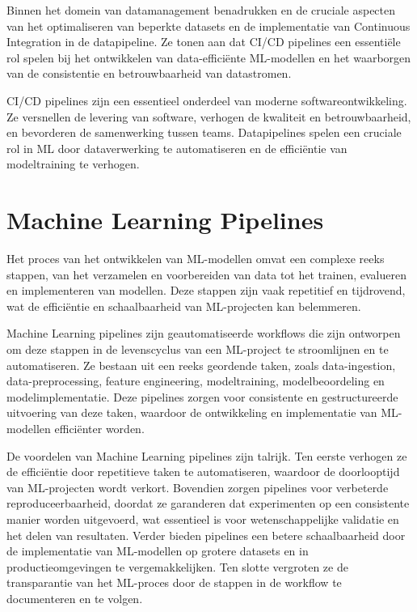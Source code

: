 
Binnen het domein van datamanagement benadrukken \textcite{Samad2018} en \textcite{Vadavalasa2020} de cruciale aspecten van het optimaliseren van beperkte datasets en de implementatie van Continuous Integration in de datapipeline. Ze tonen aan dat CI/CD pipelines een essentiële rol spelen bij het ontwikkelen van data-efficiënte ML-modellen en het waarborgen van de consistentie en betrouwbaarheid van datastromen.

CI/CD pipelines zijn een essentieel onderdeel van moderne softwareontwikkeling. Ze versnellen de levering van software, verhogen de kwaliteit en betrouwbaarheid, en bevorderen de samenwerking tussen teams. Datapipelines spelen een cruciale rol in ML door dataverwerking te automatiseren en de efficiëntie van modeltraining te verhogen.
\section{Machine Learning Pipelines}

Het proces van het ontwikkelen van ML-modellen omvat een complexe reeks stappen, van het verzamelen en voorbereiden van data tot het trainen, evalueren en implementeren van modellen. Deze stappen zijn vaak repetitief en tijdrovend, wat de efficiëntie en schaalbaarheid van ML-projecten kan belemmeren.

Machine Learning pipelines zijn geautomatiseerde workflows die zijn ontworpen om deze stappen in de levenscyclus van een ML-project te stroomlijnen en te automatiseren. Ze bestaan uit een reeks geordende taken, zoals data-ingestion, data-preprocessing, feature engineering, modeltraining, modelbeoordeling en modelimplementatie. Deze pipelines zorgen voor consistente en gestructureerde uitvoering van deze taken, waardoor de ontwikkeling en implementatie van ML-modellen efficiënter worden.

De voordelen van Machine Learning pipelines zijn talrijk. Ten eerste verhogen ze de efficiëntie door repetitieve taken te automatiseren, waardoor de doorlooptijd van ML-projecten wordt verkort. Bovendien zorgen pipelines voor verbeterde reproduceerbaarheid, doordat ze garanderen dat experimenten op een consistente manier worden uitgevoerd, wat essentieel is voor wetenschappelijke validatie en het delen van resultaten. Verder bieden pipelines een betere schaalbaarheid door de implementatie van ML-modellen op grotere datasets en in productieomgevingen te vergemakkelijken. Ten slotte vergroten ze de transparantie van het ML-proces door de stappen in de workflow te documenteren en te volgen.

